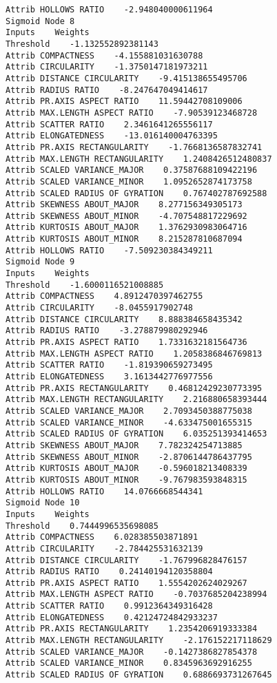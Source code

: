 \documentclass[
	article,			%
	11pt,				%
	oneside,			%
	a4paper,			%
	english,			%
	brazil,				%
	sumario=tradicional
	]{abntex2}
\begin{document}
\begin{lstlisting}
Attrib HOLLOWS RATIO    -2.948040000611964
Sigmoid Node 8
Inputs    Weights
Threshold    -1.132552892381143
Attrib COMPACTNESS    -4.155881031630788
Attrib CIRCULARITY    -1.3750147181973211
Attrib DISTANCE CIRCULARITY    -9.415138655495706
Attrib RADIUS RATIO    -8.247647049414617
Attrib PR.AXIS ASPECT RATIO    11.59442708109006
Attrib MAX.LENGTH ASPECT RATIO    -7.90539123468728
Attrib SCATTER RATIO    2.3461641265556117
Attrib ELONGATEDNESS    -13.016140004763395
Attrib PR.AXIS RECTANGULARITY    -1.7668136587832741
Attrib MAX.LENGTH RECTANGULARITY    1.2408426512480837
Attrib SCALED VARIANCE_MAJOR    0.37587688109422196
Attrib SCALED VARIANCE_MINOR    1.0952652874173758
Attrib SCALED RADIUS OF GYRATION    0.767402787692588
Attrib SKEWNESS ABOUT_MAJOR    8.277156349305173
Attrib SKEWNESS ABOUT_MINOR    -4.707548817229692
Attrib KURTOSIS ABOUT_MAJOR    1.3762930983064716
Attrib KURTOSIS ABOUT_MINOR    8.215287810687094
Attrib HOLLOWS RATIO    -7.509230384349211
Sigmoid Node 9
Inputs    Weights
Threshold    -1.6000116521008885
Attrib COMPACTNESS    4.8912470397462755
Attrib CIRCULARITY    -8.0455917902748
Attrib DISTANCE CIRCULARITY    8.888384658435342
Attrib RADIUS RATIO    -3.278879980292946
Attrib PR.AXIS ASPECT RATIO    1.7331632181564736
Attrib MAX.LENGTH ASPECT RATIO    1.2058386846769813
Attrib SCATTER RATIO    -1.819390659273495
Attrib ELONGATEDNESS    3.1613442776977556
Attrib PR.AXIS RECTANGULARITY    0.46812429230773395
Attrib MAX.LENGTH RECTANGULARITY    2.216880658393444
Attrib SCALED VARIANCE_MAJOR    2.7093450388775038
Attrib SCALED VARIANCE_MINOR    -4.633475001655315
Attrib SCALED RADIUS OF GYRATION    6.035251393414653
Attrib SKEWNESS ABOUT_MAJOR    7.782324254713885
Attrib SKEWNESS ABOUT_MINOR    -2.8706144786437795
Attrib KURTOSIS ABOUT_MAJOR    -0.596018213408339
Attrib KURTOSIS ABOUT_MINOR    -9.767983593848315
Attrib HOLLOWS RATIO    14.0766668544341
Sigmoid Node 10
Inputs    Weights
Threshold    0.7444996535698085
Attrib COMPACTNESS    6.028385503871891
Attrib CIRCULARITY    -2.784425531632139
Attrib DISTANCE CIRCULARITY    -1.767996828476157
Attrib RADIUS RATIO    0.24140194120358804
Attrib PR.AXIS ASPECT RATIO    1.5554202624029267
Attrib MAX.LENGTH ASPECT RATIO    -0.7037685204238994
Attrib SCATTER RATIO    0.9912364349316428
Attrib ELONGATEDNESS    0.42124724842933237
Attrib PR.AXIS RECTANGULARITY    1.2354206919333384
Attrib MAX.LENGTH RECTANGULARITY    -2.176152217118629
Attrib SCALED VARIANCE_MAJOR    -0.1427386827854378
Attrib SCALED VARIANCE_MINOR    0.8345963692916255
Attrib SCALED RADIUS OF GYRATION    0.6886693731267645

\end{lstlisting}
\end{document}
